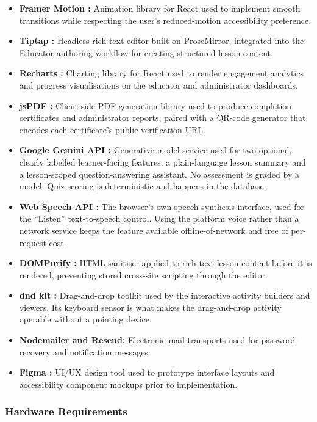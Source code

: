 \documentclass[12pt, oneside]{article} %
\begin{document}
\begin{itemize}
    \item \textbf{Framer Motion \cite{framer_motion_docs}:} Animation library for React used to implement smooth transitions while respecting the user's reduced-motion accessibility preference.
    \item \textbf{Tiptap \cite{tiptap_docs}:} Headless rich-text editor built on ProseMirror, integrated into the Educator authoring workflow for creating structured lesson content.
    \item \textbf{Recharts \cite{recharts_docs}:} Charting library for React used to render engagement analytics and progress visualisations on the educator and administrator dashboards.
    \item \textbf{jsPDF \cite{jspdf_docs}:} Client-side PDF generation library used to produce completion certificates and administrator reports, paired with a QR-code generator that encodes each certificate's public verification URL.
    \item \textbf{Google Gemini API \cite{gemini_api}:} Generative model service used for two optional, clearly labelled learner-facing features: a plain-language lesson summary and a lesson-scoped question-answering assistant. No assessment is graded by a model. Quiz scoring is deterministic and happens in the database.
    \item \textbf{Web Speech API \cite{webspeech_api}:} The browser's own speech-synthesis interface, used for the ``Listen'' text-to-speech control. Using the platform voice rather than a network service keeps the feature available offline-of-network and free of per-request cost.
    \item \textbf{DOMPurify \cite{dompurify}:} HTML sanitiser applied to rich-text lesson content before it is rendered, preventing stored cross-site scripting through the editor.
    \item \textbf{dnd kit \cite{dndkit}:} Drag-and-drop toolkit used by the interactive activity builders and viewers. Its keyboard sensor is what makes the drag-and-drop activity operable without a pointing device.
    \item \textbf{Nodemailer and Resend:} Electronic mail transports used for password-recovery and notification messages.
    \item \textbf{Figma \cite{figma_software}:} UI/UX design tool used to prototype interface layouts and accessibility component mockups prior to implementation.
\end{itemize}

\subsubsection{Hardware Requirements}
\end{document}
